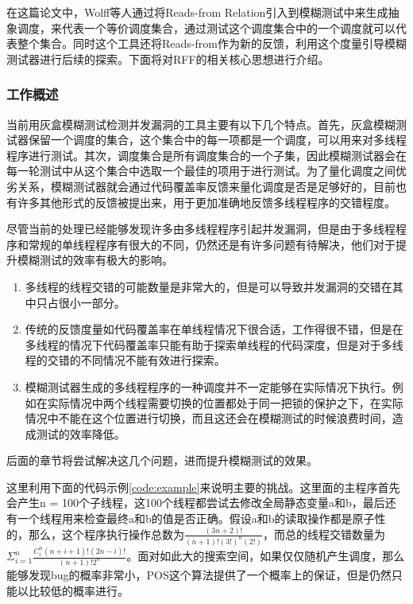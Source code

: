 在这篇论文中，Wolff\cite{wolff2024greybox}等人通过将Reads-from Relation引入到模糊测试中来生成抽象调度，来代表一个等价调度集合，通过测试这个调度集合中的一个调度就可以代表整个集合。同时这个工具还将Reads-from作为新的反馈，利用这个度量引导模糊测试器进行后续的探索。下面将对RFF的相关核心思想进行介绍。

\subsubsection{工作概述}

当前用灰盒模糊测试检测并发漏洞的工具主要有以下几个特点。首先，灰盒模糊测试器保留一个调度的集合，这个集合中的每一项都是一个调度，可以用来对多线程程序进行测试。其次，调度集合是所有调度集合的一个子集，因此模糊测试器会在每一轮测试中从这个集合中选取一个最佳的项用于进行测试。为了量化调度之间优劣关系，模糊测试器就会通过代码覆盖率反馈来量化调度是否是足够好的，目前也有许多其他形式的反馈被提出来，用于更加准确地反馈多线程程序的交错程度。

尽管当前的处理已经能够发现许多由多线程程序引起并发漏洞，但是由于多线程程序和常规的单线程程序有很大的不同，仍然还是有许多问题有待解决，他们对于提升模糊测试的效率有极大的影响。
\begin{enumerate}
\item 多线程的线程交错的可能数量是非常大的，但是可以导致并发漏洞的交错在其中只占很小一部分。
\item 传统的反馈度量如代码覆盖率在单线程情况下很合适，工作得很不错，但是在多线程的情况下代码覆盖率只能有助于探索单线程的代码深度，但是对于多线程的交错的不同情况不能有效进行探索。
\item 模糊测试器生成的多线程程序的一种调度并不一定能够在实际情况下执行。例如在实际情况中两个线程需要切换的位置都处于同一把锁的保护之下，在实际情况中不能在这个位置进行切换，而且这还会在模糊测试的时候浪费时间，造成测试的效率降低。
\end{enumerate}

后面的章节将尝试解决这几个问题，进而提升模糊测试的效果。

这里利用下面的代码示例\autoref{code:example}来说明主要的挑战。这里面的主程序首先会产生n = 100个子线程，这100个线程都尝试去修改全局静态变量a和b，最后还有一个线程用来检查最终a和b的值是否正确。假设a和b的读取操作都是原子性的，那么，这个程序执行操作总数为$\frac{(3n+2)!}{(n+1)!(3!)^n(2!)}$，而总的线程交错数量为$\Sigma^n_{i=1}\frac{C_i^n(n+i+1)!(2n-i)!}{(n+1)!2^n}$。面对如此大的搜索空间，如果仅仅随机产生调度，那么能够发现bug的概率非常小，POS这个算法提供了一个概率上的保证，但是仍然只能以比较低的概率进行。

